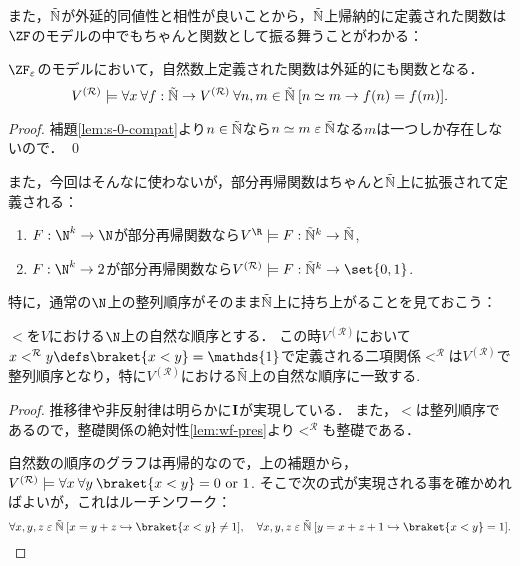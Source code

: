 \documentclass[realisability.tex]{subfiles}
\begin{document}
また，$\NN$が外延的同値性と相性が良いことから，$\NN$上帰納的に定義された関数は$\ZF$のモデルの中でもちゃんと関数として振る舞うことがわかる：

\begin{lemma}\label{lem:nat-func-strong}
 $\ZF_{\varepsilon}$のモデルにおいて，自然数上定義された関数は外延的にも関数となる．
 \[
 V^{(\mathcal{R})} \models \forall x \: \forall f : \mathord{\tilde{\mathbb{N}}} \to V^{(\mathcal{R})}\:
 \forall n, m \in \mathord{\tilde{\mathbb{N}}} \: [n \simeq m \to f(n) = f(m)].
 \]
\end{lemma}
\begin{proof}
 補題\ref{lem:s-0-compat}より$n \in \mathord{\tilde{\mathbb{N}}}$なら$n \simeq m \mathrel{\varepsilon} \mathord{\tilde{\mathbb{N}}}$なる$m$は一つしか存在しないので． \qed
\end{proof}

また，今回はそんなに使わないが，部分再帰関数はちゃんと$\NN$上に拡張されて定義される：
\begin{lemma}\label{lem:recursives-defined}
 \begin{enumerate}
  \item $F: \N^k \to \N$が部分再帰関数なら$V^{\R} \models F: \NN^k \to \NN$,
  \item $F: \N^k \to 2$が部分再帰関数なら$V^{(\mathcal{R})} \models F: \NN^k \to \set{0, 1}$.
 \end{enumerate}
\end{lemma}

特に，通常の$\N$上の整列順序がそのまま$\NN$上に持ち上がることを見ておこう：

\begin{lemma}[$\NN$における自然な順序]\label{lem:nat-ord-in-NN}
 ${<}$を$V$における$\N$上の自然な順序とする．
 この時$V^{(\mathcal{R})}$において$x <^{\mathcal{R}} y \defs \braket{x < y} = \mathds{1}$で定義される二項関係$<^{\mathcal{R}}$は$V^{(\mathcal{R})}$で整列順序となり，特に$V^{(\mathcal{R})}$における$\NN$上の自然な順序に一致する.
\end{lemma}
\begin{proof}
 推移律や非反射律は明らかに$\mathsf{\mathbf{I}}$が実現している．
 また，$<$は整列順序であるので，整礎関係の絶対性\ref{lem:wf-pres}より$<^\mathcal{R}$も整礎である．

 自然数の順序のグラフは再帰的なので，上の補題から，$V^{(\mathcal{R})} \models \forall x\: \forall y\: \braket{x < y} = 0 \text{ or } 1$.
 そこで次の式が実現される事を確かめればよいが，これはルーチンワーク：
 \[
  \forall x, y, z \strin \NN\: [x = y + z \hookrightarrow \braket{x < y} \neq 1],\quad
  \forall x, y, z \strin \NN\: [y = x + z + 1 \hookrightarrow \braket{x < y} = 1].
 \]
\end{proof}
\end{document}
